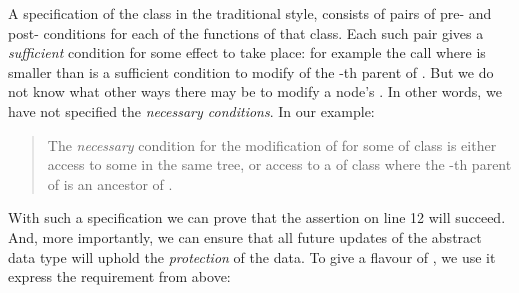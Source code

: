 A  specification of the class  
in the traditional   style, \eg  \cite{Leavens-etal07} %
consists of pairs of pre- and post- conditions for each of the
functions of that class. Each such pair gives a {\em sufficient}
condition for some effect to take place: for example the
call  where  is smaller
than  is a sufficient condition to
modify    of the -th parent of . But
we do not know what other ways there may be  to modify a
node's  . In other words, we have not specified
the \emph{necessary conditions}.
%
%
%
In our example:

\begin{quote}
The \emph{necessary} condition for the modification of  for some  of class   is either access to some    in the same tree, or  access to a  of class  where the -th parent of  is an ancestor of .
\end{quote}


With such a specification we can prove that the assertion on line 12 will succeed. And, more importantly, we can ensure that all future updates of the  abstract data type will uphold the \emph{protection} of the  data.
%
%
To give a flavour of \Chainmail, we use it  express the requirement from above:
\vspace{.1cm}

